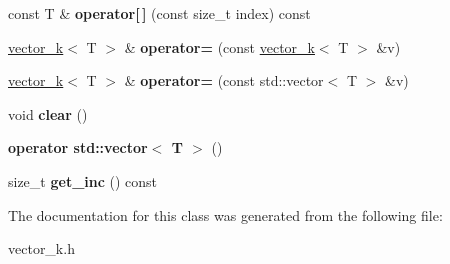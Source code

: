 \begin{DoxyCompactItemize}
\item 
\hypertarget{classkeycpp_1_1vector__k_af9fc299b3eecce09bb7166954acf7b16}{const T \& {\bfseries operator\mbox{[}$\,$\mbox{]}} (const size\-\_\-t index) const }\label{classkeycpp_1_1vector__k_af9fc299b3eecce09bb7166954acf7b16}

\item 
\hypertarget{classkeycpp_1_1vector__k_ab2030403334539d7df1001e8b9037fa9}{\hyperlink{classkeycpp_1_1vector__k}{vector\-\_\-k}$<$ T $>$ \& {\bfseries operator=} (const \hyperlink{classkeycpp_1_1vector__k}{vector\-\_\-k}$<$ T $>$ \&v)}\label{classkeycpp_1_1vector__k_ab2030403334539d7df1001e8b9037fa9}

\item 
\hypertarget{classkeycpp_1_1vector__k_a318832966719bc35aa0147ec2aeabb6f}{\hyperlink{classkeycpp_1_1vector__k}{vector\-\_\-k}$<$ T $>$ \& {\bfseries operator=} (const std\-::vector$<$ T $>$ \&v)}\label{classkeycpp_1_1vector__k_a318832966719bc35aa0147ec2aeabb6f}

\item 
\hypertarget{classkeycpp_1_1vector__k_a926f7d20093e3b36e92f10aaeea1e909}{void {\bfseries clear} ()}\label{classkeycpp_1_1vector__k_a926f7d20093e3b36e92f10aaeea1e909}

\item 
\hypertarget{classkeycpp_1_1vector__k_a54ffbb92ed1926e6066d26db886b4132}{{\bfseries operator std\-::vector$<$ T $>$} ()}\label{classkeycpp_1_1vector__k_a54ffbb92ed1926e6066d26db886b4132}

\item 
\hypertarget{classkeycpp_1_1vector__k_a09f9ee871078a9f6602d564088a0e2ac}{size\-\_\-t {\bfseries get\-\_\-inc} () const }\label{classkeycpp_1_1vector__k_a09f9ee871078a9f6602d564088a0e2ac}

\end{DoxyCompactItemize}


The documentation for this class was generated from the following file\-:\begin{DoxyCompactItemize}
\item 
vector\-\_\-k.\-h\end{DoxyCompactItemize}
